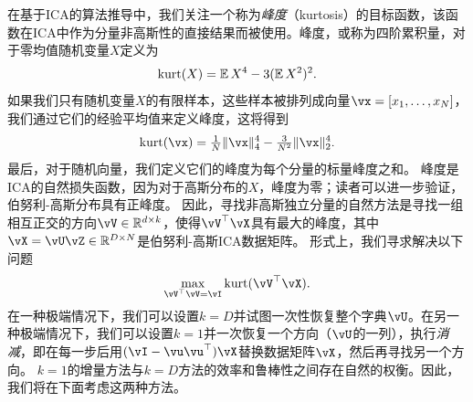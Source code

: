 \documentclass[../../book-main.tex]{subfiles}
\begin{document}
在基于ICA的算法推导中，我们关注一个称为\textit{峰度}（kurtosis）的目标函数，该函数在ICA中作为分量非高斯性的直接结果而被使用。峰度，或称为四阶累积量，对于零均值随机变量$X$定义为
\begin{equation}\label{eq:kurtosis}
\mathop{\mathrm{kurt}}(X) = \operatorname{\mathbb{E}}{X^4} - 3 (\operatorname{\mathbb{E}}{X^2})^2.
\end{equation}
如果我们只有随机变量$X$的有限样本，这些样本被排列成向量$\vx = [x_1, \dots, x_N]$，我们通过它们的经验平均值来定义峰度，这将得到
\begin{equation}\label{eq:kurtosis-vector}
\kurt(\vx) = \tfrac{1}{N} \norm{\vx}_4^4 - \tfrac{3}{N^2} \norm{\vx}_2^4.
\end{equation}
最后，对于随机向量，我们定义它们的峰度为每个分量的标量峰度之和。
峰度是ICA的自然损失函数，因为对于高斯分布的$X$，峰度为零；读者可以进一步验证，伯努利-高斯分布具有正峰度。
因此，寻找非高斯独立分量的自然方法是寻找一组相互正交的方向$\vV \in \R^{d \times k}$，使得$\vV^\top \vX$具有最大的峰度，其中$\vX = \vU \vZ \in \R^{D \times N}$是伯努利-高斯ICA数据矩阵。
形式上，我们寻求解决以下问题
\begin{equation}
    \max_{\vV^\top \vV = \vI} \kurt(\vV^\top \vX).
\end{equation}
在一种极端情况下，我们可以设置$k = D$并试图一次性恢复整个字典$\vU$。在另一种极端情况下，我们可以设置$k=1$并一次恢复一个方向（$\vU$的一列），执行\textit{消减}，即在每一步后用$(\vI - \vu\vu^\top) \vX$替换数据矩阵$\vX$，然后再寻找另一个方向。
$k=1$的增量方法与$k=D$方法的效率和鲁棒性之间存在自然的权衡。因此，我们将在下面考虑这两种方法。
\end{document}
